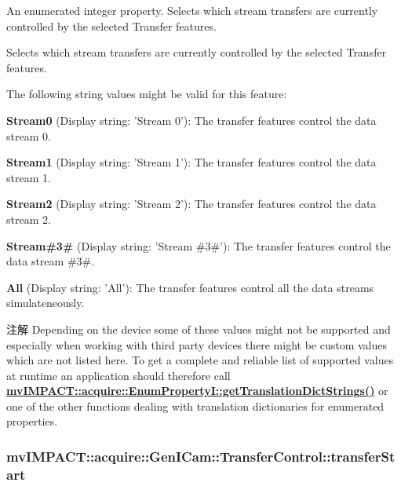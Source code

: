 An enumerated integer property. Selects which stream transfers are currently controlled by the selected Transfer features. 

Selects which stream transfers are currently controlled by the selected Transfer features.

The following string values might be valid for this feature\+:
\begin{DoxyItemize}
\item {\bfseries Stream0} (Display string\+: 'Stream 0')\+: The transfer features control the data stream 0.
\item {\bfseries Stream1} (Display string\+: 'Stream 1')\+: The transfer features control the data stream 1.
\item {\bfseries Stream2} (Display string\+: 'Stream 2')\+: The transfer features control the data stream 2.
\item {\bfseries Stream\#3\#} (Display string\+: 'Stream \#3\#')\+: The transfer features control the data stream \#3\#.
\item {\bfseries All} (Display string\+: 'All')\+: The transfer features control all the data streams simulateneously.
\end{DoxyItemize}

\begin{DoxyNote}{注解}
Depending on the device some of these values might not be supported and especially when working with third party devices there might be custom values which are not listed here. To get a complete and reliable list of supported values at runtime an application should therefore call {\bfseries \hyperlink{classmv_i_m_p_a_c_t_1_1acquire_1_1_enum_property_i_a0ba6ccbf5ee69784d5d0b537924d26b6}{mv\+I\+M\+P\+A\+C\+T\+::acquire\+::\+Enum\+Property\+I\+::get\+Translation\+Dict\+Strings()}} or one of the other functions dealing with translation dictionaries for enumerated properties. 
\end{DoxyNote}
\hypertarget{classmv_i_m_p_a_c_t_1_1acquire_1_1_gen_i_cam_1_1_transfer_control_a9300b81aca627165f0ff70b4fc0f6d3c}{
\subsubsection[{transfer\+Start}]{ mv\+I\+M\+P\+A\+C\+T\+::acquire\+::\+Gen\+I\+Cam\+::\+Transfer\+Control\+::transfer\+Start}}\label{classmv_i_m_p_a_c_t_1_1acquire_1_1_gen_i_cam_1_1_transfer_control_a9300b81aca627165f0ff70b4fc0f6d3c}



